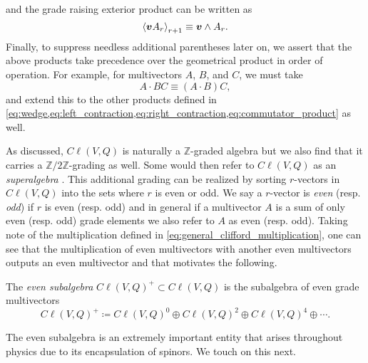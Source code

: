 and the grade raising exterior product can be written as
\begin{equation}
    \proj{r+1}{\blade{v}A_r} \equiv \blade{v} \wedge A_r.
\end{equation}
Finally, to suppress needless additional parentheses later on, we assert that the above products take precedence over the geometrical product in order of operation. For example, for multivectors $A$, $B$, and $C$, we must take
\begin{equation}
A\cdot B C \equiv (A \cdot B)C,
\end{equation}
and extend this to the other products defined in \cref{eq:wedge,eq:left_contraction,eq:right_contraction,eq:commutator_product} as well. 

As discussed, $C\ell(V,Q)$ is naturally a $\mathbb{Z}$-graded algebra but we also find that it carries a $\mathbb{Z}/2\mathbb{Z}$-grading as well. Some would then refer to $C\ell(V,Q)$ as an \emph{superalgebra} . This additional grading can be realized by sorting $r$-vectors in $C\ell(V,Q)$ into the sets where $r$ is even or odd.  We say a $r$-vector is \emph{even} (resp. \emph{odd}) if $r$ is even (resp. odd) and in general if a multivector $A$ is a sum of only even (resp. odd) grade elements we also refer to $A$ as even (resp. odd).  Taking note of the multiplication defined in \ref{eq:general_clifford_multiplication}, one can see that the multiplication of even multivectors with another even multivectors outputs an even multivector and that motivates the following.
\begin{definition}
The \emph{even subalgebra} $C\ell(V,Q)^+ \subset C\ell(V,Q)$ is the subalgebra of even grade multivectors
\begin{equation}
    C\ell(V,Q)^+ \coloneqq C\ell(V,Q)^0 \oplus C\ell(V,Q)^2 \oplus C\ell(V,Q)^4 \oplus \cdots.
\end{equation}
\end{definition}
The even subalgebra is an extremely important entity that arises throughout physics due to its encapsulation of spinors. We touch on this next.

